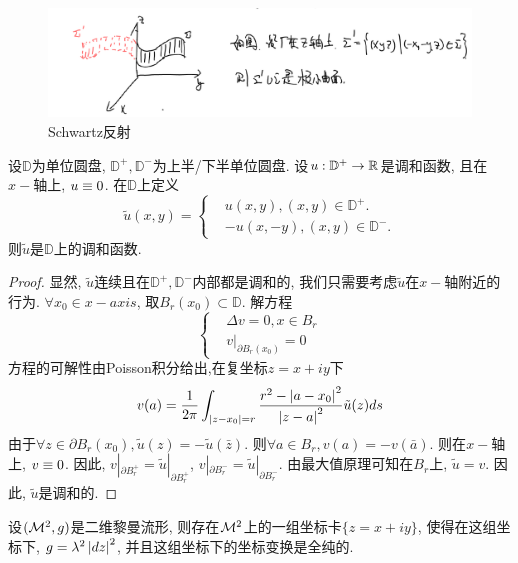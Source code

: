 \begin{figure}[ht]
	\centering
	\includegraphics[scale=0.5]{images/reflection1.png}
	\caption{Schwartz反射}
	\label{reflection1}
\end{figure}

\begin{lemma}
    设$\mathbb{D}$为单位圆盘, $\mathbb{D}^+,\mathbb{D}^-$为上半/下半单位圆盘. 设$u: \mathbb{D}^+ \to \mathbb{R}$是调和函数, 且在$x-$轴上, $u\equiv 0$. 在$\mathbb{D}$上定义
    \begin{equation}
        \tilde{u}(x,y)= \left\{
            \begin{aligned}
                &u(x,y), (x,y) \in \mathbb{D}^+.\\
                &-u(x,-y), (x,y) \in \mathbb{D}^-.
            \end{aligned}
        \right.
    \end{equation}
    则$\tilde{u}$是$\mathbb{D}$上的调和函数.
\end{lemma}
\begin{proof}
    显然, $\tilde{u}$连续且在$\mathbb{D}^+,\mathbb{D}^-$内部都是调和的, 我们只需要考虑$\tilde{u}$在$x-$轴附近的行为. $\forall x_0 \in x-axis$, 取$B_r(x_0) \subset \mathbb{D}$. 解方程
    \begin{equation}
        \left\{
            \begin{aligned}
                &\Delta v=0, x \in B_r\\
                & v|_{\partial B_r(x_0)}=0
            \end{aligned}
        \right.
    \end{equation}
    方程的可解性由Poisson积分给出,在复坐标$z=x+iy$下
    \begin{equation}
        v(a)=\frac{1}{2\pi} \int_{\left | z-x_0 \right |=r} \frac{r^2-\left | a-x_0 \right |^2}{\left | z-a \right |^2}\tilde{u}(z)ds
    \end{equation}
    由于$\forall z \in \partial B_r(x_0), \tilde{u}(z)=-\tilde{u}(\bar{z})$. 则$\forall a\in B_r, v(a)=-v(\bar{a})$. 则在$x-$轴上, $v\equiv 0$. 因此, $v|_{\partial{B_r^+}}=\tilde{u}|_{\partial{B_r^+}}$, $v|_{\partial{B_r^-}}=\tilde{u}|_{\partial{B_r^-}}$. 由最大值原理可知在$B_r$上, $\tilde{u}=v$. 因此, $\tilde{u}$是调和的.
\end{proof}
\begin{lemma}[等温坐标的存在性]
    设$({\mathcal{M}}^2, g)$是二维黎曼流形, 则存在${\mathcal{M}}^2$上的一组坐标卡$\{z=x+iy\}$, 使得在这组坐标下, $g=\lambda^2\left | dz \right |^2$, 并且这组坐标下的坐标变换是全纯的.
\end{lemma}

